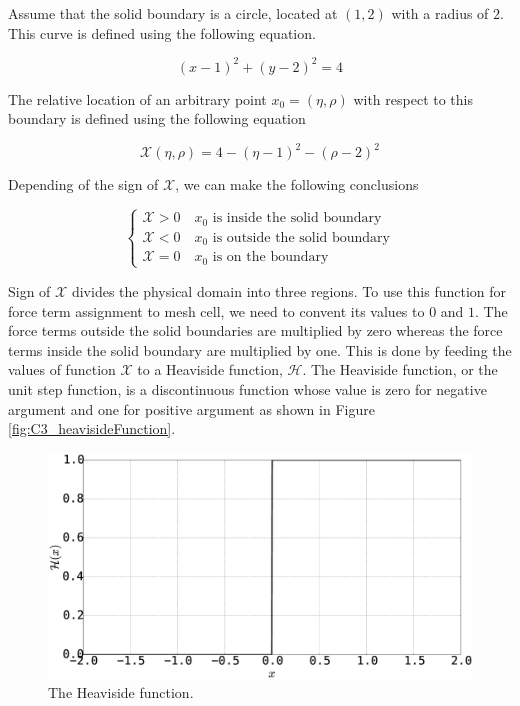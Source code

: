 Assume that the solid boundary is a circle, located at $(1,2)$ with a radius of $2$. This curve is defined using the following equation.

\begin{equation}
	(x - 1)^2 + (y - 2)^2 = 4
\end{equation}

The relative location of an arbitrary point $x_0 = (\eta, \rho)$ with respect to this boundary is defined using the following equation

\begin{equation}
	\mathcal{X}(\eta, \rho) = 4 - (\eta - 1)^2 - (\rho - 2)^2
\end{equation}

Depending of the sign of $\mathcal{X}$, we can make the following conclusions

\begin{equation}
\begin{cases}
	\mathcal{X} > 0 \quad \text{$x_0$ is inside the solid boundary} \\
	\mathcal{X} < 0 \quad \text{$x_0$ is outside the solid boundary} \\
	\mathcal{X} = 0 \quad \text{$x_0$ is on the boundary}
\end{cases}
\end{equation}

Sign of $\mathcal{X}$ divides the physical domain into three regions. To use this function for force term assignment to mesh cell, we need to convent its values to $0$ and $1$. The force terms outside the solid boundaries are multiplied by zero whereas the force terms inside the solid boundary are multiplied by one. This is done by feeding the values of function $\mathcal{X}$ to a Heaviside function, $\mathcal{H}$. The Heaviside function, or the unit step function, is a discontinuous function whose value is zero for negative argument and one for positive argument as shown in Figure \ref{fig:C3_heavisideFunction}.

\begin{figure}[H]
	\centering
	\includegraphics[width=14.cm]{Chapter_3/figure/Heaviside_Function.eps}
	\caption{The Heaviside function.}
	\label{{fig:C3_heavisideFunction}}
\end{figure}

